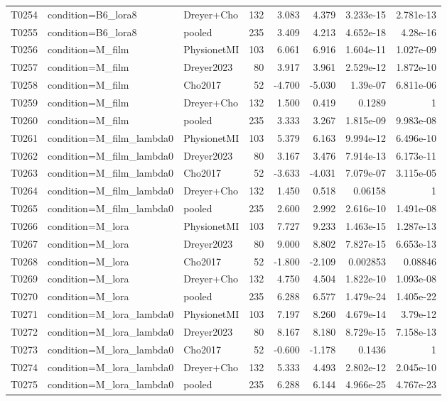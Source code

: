 \begin{longtable}{p{.45in}p{2.6in}p{.75in}rrrrr}
T0254 & condition=B6\_\allowbreak{}lora8 & Dreyer+Cho & 132 & 3.083 & 4.379 & 3.233e-15 & 2.781e-13 \\
T0255 & condition=B6\_\allowbreak{}lora8 & pooled & 235 & 3.409 & 4.213 & 4.652e-18 & 4.28e-16 \\
T0256 & condition=M\_\allowbreak{}film & PhysionetMI & 103 & 6.061 & 6.916 & 1.604e-11 & 1.027e-09 \\
T0257 & condition=M\_\allowbreak{}film & Dreyer2023 & 80 & 3.917 & 3.961 & 2.529e-12 & 1.872e-10 \\
T0258 & condition=M\_\allowbreak{}film & Cho2017 & 52 & -4.700 & -5.030 & 1.39e-07 & 6.811e-06 \\
T0259 & condition=M\_\allowbreak{}film & Dreyer+Cho & 132 & 1.500 & 0.419 & 0.1289 & 1 \\
T0260 & condition=M\_\allowbreak{}film & pooled & 235 & 3.333 & 3.267 & 1.815e-09 & 9.983e-08 \\
T0261 & condition=M\_\allowbreak{}film\_\allowbreak{}lambda0 & PhysionetMI & 103 & 5.379 & 6.163 & 9.994e-12 & 6.496e-10 \\
T0262 & condition=M\_\allowbreak{}film\_\allowbreak{}lambda0 & Dreyer2023 & 80 & 3.167 & 3.476 & 7.914e-13 & 6.173e-11 \\
T0263 & condition=M\_\allowbreak{}film\_\allowbreak{}lambda0 & Cho2017 & 52 & -3.633 & -4.031 & 7.079e-07 & 3.115e-05 \\
T0264 & condition=M\_\allowbreak{}film\_\allowbreak{}lambda0 & Dreyer+Cho & 132 & 1.450 & 0.518 & 0.06158 & 1 \\
T0265 & condition=M\_\allowbreak{}film\_\allowbreak{}lambda0 & pooled & 235 & 2.600 & 2.992 & 2.616e-10 & 1.491e-08 \\
T0266 & condition=M\_\allowbreak{}lora & PhysionetMI & 103 & 7.727 & 9.233 & 1.463e-15 & 1.287e-13 \\
T0267 & condition=M\_\allowbreak{}lora & Dreyer2023 & 80 & 9.000 & 8.802 & 7.827e-15 & 6.653e-13 \\
T0268 & condition=M\_\allowbreak{}lora & Cho2017 & 52 & -1.800 & -2.109 & 0.002853 & 0.08846 \\
T0269 & condition=M\_\allowbreak{}lora & Dreyer+Cho & 132 & 4.750 & 4.504 & 1.822e-10 & 1.093e-08 \\
T0270 & condition=M\_\allowbreak{}lora & pooled & 235 & 6.288 & 6.577 & 1.479e-24 & 1.405e-22 \\
T0271 & condition=M\_\allowbreak{}lora\_\allowbreak{}lambda0 & PhysionetMI & 103 & 7.197 & 8.260 & 4.679e-14 & 3.79e-12 \\
T0272 & condition=M\_\allowbreak{}lora\_\allowbreak{}lambda0 & Dreyer2023 & 80 & 8.167 & 8.180 & 8.729e-15 & 7.158e-13 \\
T0273 & condition=M\_\allowbreak{}lora\_\allowbreak{}lambda0 & Cho2017 & 52 & -0.600 & -1.178 & 0.1436 & 1 \\
T0274 & condition=M\_\allowbreak{}lora\_\allowbreak{}lambda0 & Dreyer+Cho & 132 & 5.333 & 4.493 & 2.802e-12 & 2.045e-10 \\
T0275 & condition=M\_\allowbreak{}lora\_\allowbreak{}lambda0 & pooled & 235 & 6.288 & 6.144 & 4.966e-25 & 4.767e-23 \\
\bottomrule
\end{longtable}
